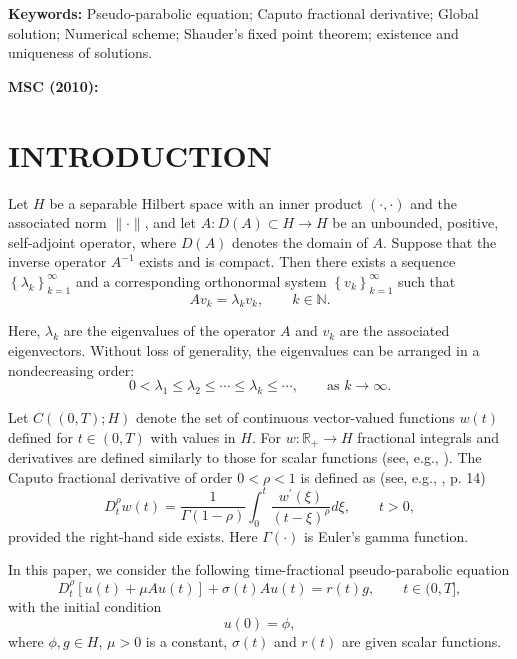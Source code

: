 \documentclass[reqno]{amsart}
\theoremstyle{definition}
\numberwithin{equation}{section}
\begin{document}
\textbf{Keywords:} Pseudo-parabolic equation; Caputo fractional
derivative; Global solution; Numerical scheme; Shauder's fixed point theorem;  existence and uniqueness of solutions.

\textbf{MSC (2010):} 


\makeatletter
\renewcommand{\@evenhead}{\vbox{\thepage \hfil {\it R. Ashurov and E. Husanov }  \hrule }}
\renewcommand{\@oddhead}{\vbox{\hfill
{\it Inverse problem for the fractional-order heat equation with an unknown source term }\hfill
\thepage \hrule}} \makeatother

\label{firstpage}

\section{INTRODUCTION}

Let $H$ be a separable Hilbert space with an inner product $(\cdot,\cdot)$ and the associated norm $\|\cdot\|$, and let $A: D(A) \subset H \rightarrow H$ be an unbounded, positive, self-adjoint operator, where $D(A)$ denotes the domain of $A$. Suppose that the inverse operator $A^{-1}$ exists and is compact. Then there exists a sequence $\left\{\lambda_k\right\}_{k=1}^{\infty}$ and a corresponding orthonormal system $\left\{v_k\right\}_{k=1}^{\infty}$ such that
$$
A v_k=\lambda_k v_k, \qquad k \in \mathbb{N}.
$$

Here, $\lambda_k$ are the eigenvalues of the operator $A$ and $v_k$ are the associated eigenvectors. Without loss of generality, the eigenvalues can be arranged in a nondecreasing order:
$$
0 < \lambda_1 \le \lambda_2 \le \cdots \le \lambda_k \le \cdots,
\qquad \text{as } k \to \infty.
$$

Let $C((0, T) ; H)$ denote the set of continuous vector-valued functions $w(t)$ defined for $t \in(0, T)$ with values in $H$. For $w: \mathbb{R}_{+} \rightarrow H$ fractional integrals and derivatives are defined similarly to those for scalar functions (see, e.g., \cite{Lizama}). The Caputo fractional derivative of order $0 < \rho < 1$ is defined as (see, e.g., \cite{Pskhu}, p. 14)
$$
D_t^\rho w(t)=\frac{1}{\Gamma(1-\rho)} \int_0^t \frac{w^{\prime}(\xi)}{(t-\xi)^\rho} d \xi , \qquad t>0,
$$
provided the right-hand side exists. Here $\Gamma(\cdot)$ is Euler's gamma function.

In this paper, we consider the following time-fractional pseudo-parabolic equation
\begin{equation} \label{1.1}
    D_t^{\rho} [u(t) + \mu Au(t)] + \sigma(t) Au(t) = r(t)g, \qquad t \in (0,T],
\end{equation}
with the initial condition
\begin{equation} \label{1.2}
    u(0) = \phi,
\end{equation}
where $\phi, g \in H$, $\mu>0$ is a constant, $\sigma(t)$ and $r(t)$ are given scalar functions. 
\end{document}

